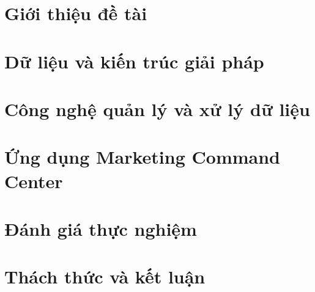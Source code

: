 \documentclass[12pt, a4paper]{report}
\theoremstyle{definition}
\DeclareRobustCommand{\_}{\textunderscore\allowbreak}
\begin{document}
\newpage

\tableofcontents
\listoffigures
\listoftables



\pagestyle{fancy}
\renewcommand{\chaptermark}[1]{\markboth{\MakeUppercase{#1}}{}}
\fancyhf{}
\fancyhead[LE,RO]{\leftmark}
\fancyhead[RE,LO]{}
\fancyfoot[LE,RO]{\thepage}
\renewcommand{\footrulewidth}{0.4pt}




\newpage
\chapter{Giới thiệu đề tài}
\label{chap:gioi-thieu}


\newpage
\chapter{Dữ liệu và kiến trúc giải pháp}
\label{chap:du-lieu-kien-truc}


\newpage
\chapter{Công nghệ quản lý và xử lý dữ liệu}
\label{chap:cong-nghe}


\newpage
\chapter{Ứng dụng Marketing Command Center}
\label{chap:ung-dung}


\newpage
\chapter{Đánh giá thực nghiệm}
\label{chap:danh-gia}


\newpage
\chapter{Thách thức và kết luận}
\label{chap:ket-luan}



\newpage


\end{document}
